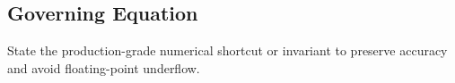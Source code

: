 \begin{cheatsheetpages}
\subsection*{Governing Equation}


\begin{shortcutbox}
State the production-grade numerical shortcut or invariant to preserve accuracy and avoid floating-point underflow.
\end{shortcutbox}

\end{cheatsheetpages}
